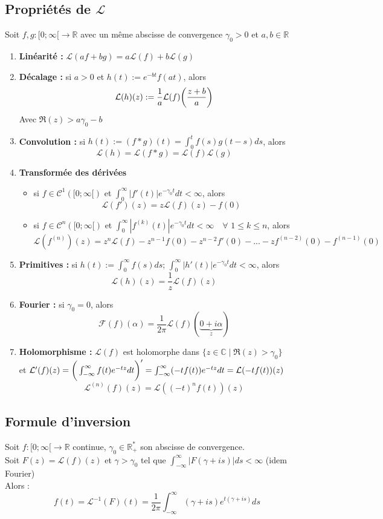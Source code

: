 \subsection{Propriétés de $\mathcal{L}$}
Soit $f,g : [0;\infty[ \to \mathbb{R}$ avec un même abscisse de convergence $\gamma_0 > 0$ et $a,b \in \mathbb{R}$
\begin{enumerate}
    \item \textbf{Linéarité :} $\mathcal{L}(af+bg) = a \mathcal{L}(f) + b \mathcal{L}(g)$
    \item \textbf{Décalage :} si $a > 0$ et $h(t) := e^{-bt}f(at)$, alors
    $$\mathcal{L}(h)(z) := \frac{1}{a} \mathcal{L}(f)\bigg{(}\frac{z+b}{a}\bigg{)}$$
    Avec $\Re(z) > a\gamma_0-b$
    \item \textbf{Convolution :} si $h(t) := (f \ast g)(t) = \int_0^t f(s)g(t-s)ds$, alors
    $$\mathcal{L}(h) = \mathcal{L}(f \ast g) = \mathcal{L}(f) \mathcal{L}(g)$$
    \item \textbf{Transformée des dérivées}
    \begin{itemize}
        \item si $f \in \mathcal{C}^1([0;\infty[)$ et $\int_0^{\infty} |f'(t)|e^{-\gamma_0 t}dt < \infty$, alors
        $$\mathcal{L}(f')(z) = z \mathcal{L}(f)(z) - f(0)$$
        \item si $f \in \mathcal{C}^n([0;\infty[)$ et $\int_0^{\infty} |f^{(k)}(t)|e^{-\gamma_0 t}dt < \infty \quad \forall$ $1 \leq k \leq n$, alors
        $$\mathcal{L}(f^{(n)})(z) = z^n \mathcal{L}(f) - z^{n-1}f(0) - z^{n-2}f'(0) -...- zf^{(n-2)}(0) - f^{(n-1)}(0)$$
    \end{itemize}
    \item \textbf{Primitives :} si $h(t) := \int_0^{\infty}f(s)ds$; $\int_0^{\infty} |h'(t)|e^{-\gamma_0 t}dt < \infty$, alors
    $$\mathcal{L}(h)(z) = \frac{1}{z}\mathcal{L}(f)(z)$$
    \item \textbf{Fourier :} si $\gamma_0 = 0$, alors
    $$\mathcal{F}(f)(\alpha) = \frac{1}{2\pi}\mathcal{L}(f)(\underbrace{0+i\alpha}_z)$$
    \item \textbf{Holomorphisme :} $\mathcal{L}(f)$ est holomorphe dans $\{z \in \mathbb{C} \mid \Re(z) > \gamma_0\}$ \\
    et $\mathcal{L}'(f)(z) = \bigg{(}\int_{-\infty}^{\infty}f(t)e^{-tz}dt \bigg{)}' = \int_{-\infty}^{\infty}(-tf(t))e^{-tz}dt = \mathcal{L}(-tf(t))(z)$
    $$\mathcal{L}^{(n)}(f)(z) = \mathcal{L}((-t)^nf(t))(z)$$
\end{enumerate}

\subsection{Formule d'inversion}
Soit $f : [0;\infty[ \to \mathbb{R}$ continue, $\gamma_0 \in \mathbb{R}_+^*$ son abscisse de convergence. \\
Soit $F(z) = \mathcal{L}(f)(z)$ et $\gamma > \gamma_0$ tel que $\int_{-\infty}^{\infty}|F(\gamma + is)|ds < \infty$ (idem Fourier) \\
Alors :
$$f(t) = \mathcal{L}^{-1}(F)(t) = \frac{1}{2\pi}\int_{-\infty}^{\infty}(\gamma + is)e^{t(\gamma+is)}ds$$

